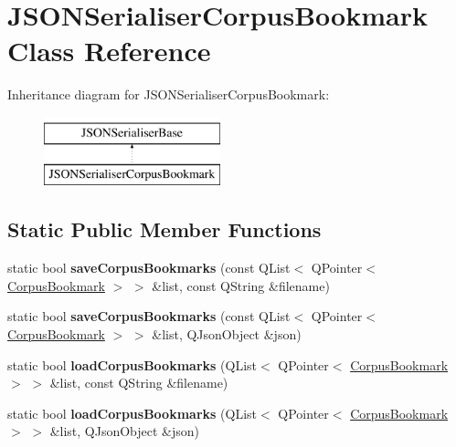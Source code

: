 \hypertarget{class_j_s_o_n_serialiser_corpus_bookmark}{}\section{J\+S\+O\+N\+Serialiser\+Corpus\+Bookmark Class Reference}
\label{class_j_s_o_n_serialiser_corpus_bookmark}
Inheritance diagram for J\+S\+O\+N\+Serialiser\+Corpus\+Bookmark\+:\begin{figure}[H]
\begin{center}
\leavevmode
\includegraphics[height=2.000000cm]{class_j_s_o_n_serialiser_corpus_bookmark}
\end{center}
\end{figure}
\subsection*{Static Public Member Functions}
\begin{DoxyCompactItemize}
\item 
\mbox{\label{class_j_s_o_n_serialiser_corpus_bookmark_ab00b1d8eef7d002fc6d35c589c59b85f}} 
static bool {\bfseries save\+Corpus\+Bookmarks} (const Q\+List$<$ Q\+Pointer$<$ \hyperlink{class_corpus_bookmark}{Corpus\+Bookmark} $>$ $>$ \&list, const Q\+String \&filename)
\item 
\mbox{\label{class_j_s_o_n_serialiser_corpus_bookmark_a32b1b9fb8385a7fe730f77fb58e76170}} 
static bool {\bfseries save\+Corpus\+Bookmarks} (const Q\+List$<$ Q\+Pointer$<$ \hyperlink{class_corpus_bookmark}{Corpus\+Bookmark} $>$ $>$ \&list, Q\+Json\+Object \&json)
\item 
\mbox{\label{class_j_s_o_n_serialiser_corpus_bookmark_afd2ac06a2fc59156ab058234578f9aa1}} 
static bool {\bfseries load\+Corpus\+Bookmarks} (Q\+List$<$ Q\+Pointer$<$ \hyperlink{class_corpus_bookmark}{Corpus\+Bookmark} $>$ $>$ \&list, const Q\+String \&filename)
\item 
\mbox{\label{class_j_s_o_n_serialiser_corpus_bookmark_a4f5932a537fa390c354a95750b30caba}} 
static bool {\bfseries load\+Corpus\+Bookmarks} (Q\+List$<$ Q\+Pointer$<$ \hyperlink{class_corpus_bookmark}{Corpus\+Bookmark} $>$ $>$ \&list, Q\+Json\+Object \&json)
\end{DoxyCompactItemize}


